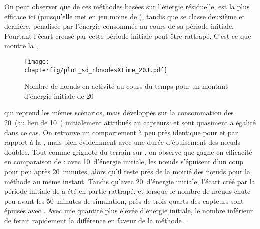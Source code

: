 On peut observer que de ces méthodes basées sur l'énergie résiduelle, \iddems est la plus efficace ici (puisqu'elle met en jeu moins de \cns), tandis que \ideres se classe deuxième et \iddemx dernière, pénalisée par l'énergie consommée au cours de sa période initiale.
Pourtant l'écart creusé par cette période initiale peut être rattrapé.
C'est ce que montre la ,
\begin{figure}[!t]
    \centering
    \texttt{[image: \\chapterfig/plot\_sd\_nbnodesXtime\_20J.pdf]}
    \caption{Nombre de nœuds en activité au cours du temps pour un montant d'énergie initiale de 20~\joule}\label{sd:fig:nbnodes-20J}
\end{figure}
qui reprend les mêmes scénarios, mais développés sur la consommation des 20~\joule (au lieu de 10~\joule) initialement attribués au capteurs: \iddemx et \ideres sont quasiment a égalité dans ce cas.
On retrouve un comportement à peu près identique pour \idstat et \idrand par rapport à la , mais bien évidemment avec une durée d'épuisement des nœuds doublée.
Tout comme \iddemx grignote du terrain sur \ideres, on observe que \iddems gagne en efficacité en comparaison de \idrand: avec 10~\joule d'énergie initiale, les nœuds s'épuisent d'un coup pour \iddems peu après 20~minutes, alors qu'il reste près de la moitié des nœuds pour la méthode \idrand au même instant.
Tandis qu'avec 20~\joule d'énergie initiale, l'écart créé par la période initiale de \iddems a été en partie rattrapé, et lorsque le nombre de nœuds chute peu avant les 50~minutes de simulation, près de trois quarts des capteurs sont épuisés avec \idrand.
Avec une quantité plus élevée d'énergie initiale, le nombre inférieur de \cns ferait rapidement la différence en faveur de la méthode \iddems.

